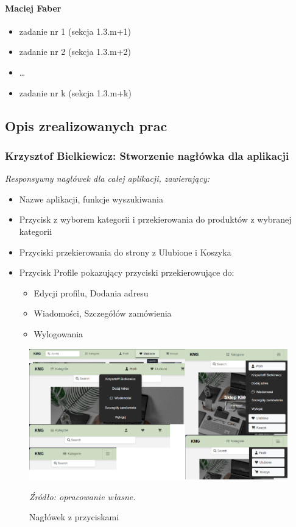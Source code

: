 \documentclass[12pt,a4paper,oneside]{article}
\theoremstyle{definition}
\numberwithin{equation}{section}
\begin{document}
\paragraph{Maciej Faber}
\begin{itemize}
\item zadanie nr 1 (sekcja 1.3.m+1)
\item zadanie nr 2 (sekcja 1.3.m+2)
\item \dots
\item zadanie nr k (sekcja 1.3.m+k)

\end{itemize}

\subsection {Opis zrealizowanych prac}
\subsubsection{Krzysztof Bielkiewicz: Stworzenie nagłówka dla aplikacji}
\label{1.3.1}
\textit{Responsywny nagłówek dla całej aplikacji, zawierający:}
\begin{itemize}
    \item Nazwe aplikacji, funkcje wyszukiwania
    \item Przycisk z wyborem kategorii i przekierowania do produktów z wybranej kategorii
    \item Przyciski przekierowania do strony z Ulubione i Koszyka
    \item Przycisk Profile pokazujący przyciski przekierowujące do:
        \begin{itemize}
            \item Edycji profilu, Dodania adresu
            \item Wiadomości, Szczegółów zamówienia
            \item Wylogowania
        \end{itemize}
\end{itemize}

\begin{figure}[H]
    \centering
    \includegraphics[width=0.9\columnwidth]{images/krzysztofBImages/header.png}
    \caption{Nagłówek z przyciskami}
    \emph{Źródło: opracowanie własne.}
\end{figure}
\end{document}
